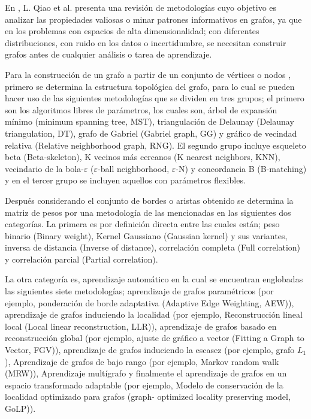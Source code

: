 
En \cite{QIAO2018336}, L. Qiao et al. presenta una revisi\'on de 
 metodolog\'ias cuyo objetivo es analizar las propiedades valiosas o minar 
 patrones informativos en grafos, ya que en los problemas con espacios de 
 alta dimensionalidad; con diferentes distribuciones, con ruido en los 
 datos o incertidumbre, se necesitan construir grafos antes de cualquier 
 an\'alisis o tarea de aprendizaje. 


Para la construcci\'on de un grafo a partir de un conjunto de v\'ertices o 
 nodos \cite{QIAO2018336}, primero se determina la estructura topol\'ogica 
 del grafo, para lo cual se pueden hacer uso de las siguientes 
 metodolog\'ias que se dividen en tres grupos; el primero son los 
 algoritmos libres de par\'ametros, los cuales son, \'arbol de expansi\'on 
 m\'inimo (minimum spanning tree, MST), triangulaci\'on de Delaunay 
 (Delaunay triangulation, DT), grafo de Gabriel (Gabriel graph, GG) y 
 gr\'afico de vecindad relativa (Relative neighborhood graph, RNG).  El 
 segundo grupo incluye esqueleto beta (Beta-skeleton), K vecinos m\'as 
 cercanos (K nearest neighbors, KNN), vecindario de la bola-$\varepsilon$ 
 ($\varepsilon$-ball neighborhood, $\varepsilon$-N) y concordancia B 
 (B-matching) y en el tercer grupo se incluyen aquellos con par\'ametros 
 flexibles.

\newpage

Despu\'es considerando el conjunto de bordes \cite{QIAO2018336} o aristas 
 obtenido se determina la matriz de pesos por una metodolog\'ia de las 
 mencionadas en las siguientes dos categor\'ias. La primera es por 
 definici\'on directa entre las cuales est\'an; peso binario (Binary 
 weight), Kernel Gaussiano (Gaussian kernel) y sus variantes, inversa de 
 distancia (Inverse of distance), correlaci\'on completa (Full correlation) 
 y correlaci\'on parcial (Partial correlation). 


La otra categor\'ia es, aprendizaje autom\'atico \cite{QIAO2018336} en la 
 cual se encuentran englobadas las siguientes siete metodolog\'ias; 
 aprendizaje de grafos param\'etricos (por ejemplo, ponderaci\'on de borde 
 adaptativa (Adaptive Edge Weighting, AEW)), aprendizaje de grafos 
 induciendo la localidad (por ejemplo, Reconstrucci\'on lineal local (Local 
 linear reconstruction, LLR)), aprendizaje de grafos basado en 
 reconstrucci\'on global (por ejemplo, ajuste de gr\'afico a vector (Fitting 
 a Graph to Vector, FGV)), aprendizaje de grafos induciendo la escasez (por 
 ejemplo, grafo $L_1$), Aprendizaje de grafos de bajo rango (por ejemplo, 
 Markov random walk (MRW)), Aprendizaje mult\'igrafo y finalmente el 
 aprendizaje de grafos en un espacio transformado adaptable (por ejemplo, 
 Modelo de conservaci\'on de la localidad optimizado para grafos (graph-
 optimized locality preserving model, GoLP)). 

